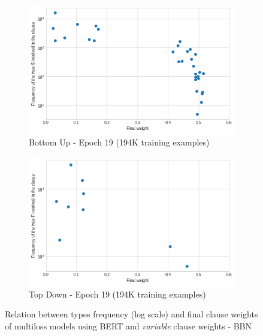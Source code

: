 \begin{figure}
     \centering
     \begin{subfigure}[b]{0.7\textwidth}
         \centering
         \includegraphics[width=\textwidth]{figures/weight_freq_bert_bbn_bu_multiloss_variable.png}
         \caption{Bottom Up - Epoch 19 (194K training examples)}
         \label{fig:weight_freq_bert_bbn_bu_multiloss_variable}
         \vspace{10px}
     \end{subfigure}
     \begin{subfigure}[b]{0.7\textwidth}
         \centering
         \includegraphics[width=\textwidth]{figures/weight_freq_bert_bbn_td_multiloss_variable.png}
         \caption{Top Down - Epoch 19 (194K training examples)}
         \label{fig:weight_freq_bert_bbn_td_multiloss_variable}
     \end{subfigure}
    \caption{Relation between types frequency (log scale) and final clause weights of multiloss models using BERT and \textit{variable} clause weights - BBN}
    \label{fig:weight_freq_bert_bbn_variable}
\end{figure}



